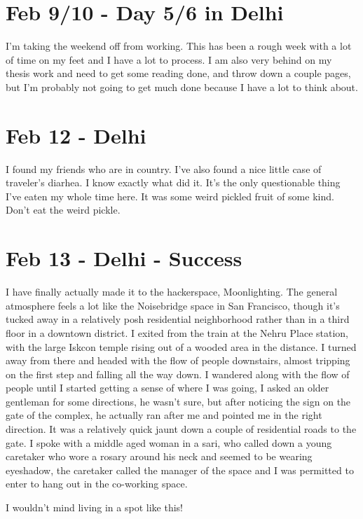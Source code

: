 \documentclass[11pt]{amsart}
\begin{document}
\section{Feb 9/10 - Day 5/6 in Delhi}

I'm taking the weekend off from working. This has been a rough week with a lot of time on my feet and I have a lot to process. I am also very behind on my thesis work and need to get some reading done, and throw down a couple pages, but I'm probably not going to get much done because I have a lot to think about.

\section{Feb 12 - Delhi}

I found my friends who are in country. I've also found a nice little case of traveler's diarhea. I know exactly what did it. It's the only questionable thing I've eaten my whole time here. It was some weird pickled fruit of some kind. Don't eat the weird pickle.

\section{Feb 13 - Delhi - Success}

I have finally actually made it to the hackerspace, Moonlighting. The general atmosphere feels a lot like the Noisebridge space in San Francisco, though it's tucked away in a relatively posh residential neighborhood rather than in a third floor in a downtown district. I exited from the train at the Nehru Place station, with the large Iskcon temple rising out of a wooded area in the distance. I turned away from there and headed with the flow of people downstairs, almost tripping on the first step and falling all the way down. I wandered along with the flow of people until I started getting a sense of where I was going, I asked an older gentleman for some directions, he wasn't sure, but after noticing the sign on the gate of the complex, he actually ran after me and pointed me in the right direction. It was a relatively quick jaunt down a couple of residential roads to the gate. I spoke with a middle aged woman in a sari, who called down a young caretaker who wore a rosary around his neck and seemed to be wearing eyeshadow, the caretaker called the manager of the space and I was permitted to enter to hang out in the co-working space.

I wouldn't mind living in a spot like this! 
\end{document}
